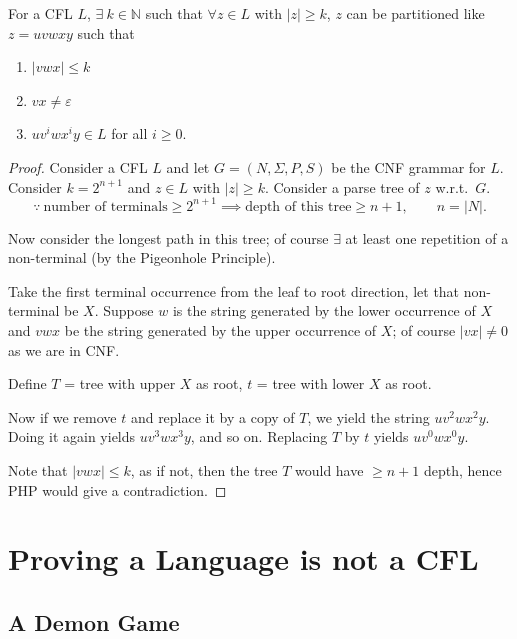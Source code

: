 \begin{blackbox}
\begin{lemma}
For a CFL $L$, $\exists\ k \in \mathbb{N}$ such that $\forall z \in L$ with $|z| \geq k$, $z$ can be partitioned like $z = uvwxy$ such that
\begin{enumerate}[1.]
    \item $|vwx| \leq k$
    \item $vx \neq \varepsilon$
    \item $uv^iwx^iy \in L$ for all $i \geq 0$.
\end{enumerate}
\end{lemma}
\end{blackbox}

\begin{proof}
Consider a CFL $L$ and let $G = (N, \Sigma, P, S)$ be the CNF grammar for $L$. Consider $k = 2^{n+1}$ and $z \in L$ with $|z| \geq k$. Consider a parse tree of $z$ w.r.t.\ $G$.
\[
\because\ \text{number of terminals} \geq 2^{n+1} \implies \text{depth of this tree} \geq n+1, \qquad n = |N|.
\]

Now consider the longest path in this tree; of course $\exists$ at least one repetition of a non-terminal (by the Pigeonhole Principle).

Take the first terminal occurrence from the leaf to root direction, let that non-terminal be $X$. Suppose $w$ is the string generated by the lower occurrence of $X$ and $vwx$ be the string generated by the upper occurrence of $X$; of course $|vx| \neq 0$ as we are in CNF.

Define $T$ = tree with upper $X$ as root, $t$ = tree with lower $X$ as root.

Now if we remove $t$ and replace it by a copy of $T$, we yield the string $uv^2wx^2y$. Doing it again yields $uv^3wx^3y$, and so on. Replacing $T$ by $t$ yields $uv^0wx^0y$.

Note that $|vwx| \leq k$, as if not, then the tree $T$ would have $\geq n+1$ depth, hence PHP would give a contradiction.
\end{proof}

\section{Proving a Language is not a CFL}

\subsection*{A Demon Game}

